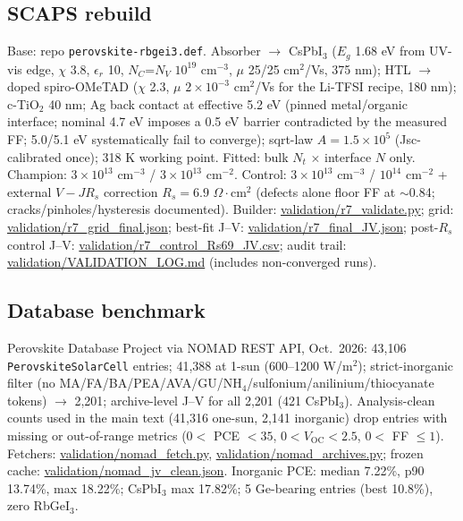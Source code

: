 \documentclass[11pt]{article}
\begin{document}
\subsection*{SCAPS rebuild}
Base: repo \texttt{perovskite-rbgei3.def}. Absorber $\rightarrow$ CsPbI$_{3}$ ($E_{g}$ 1.68 eV from UV-vis edge, $\chi$ 3.8, $\epsilon_{r}$ 10, $N_{C}$=$N_{V}$ $10^{19}$ cm$^{-3}$, $\mu$ 25/25 cm$^{2}$/Vs, 375 nm); HTL $\rightarrow$ doped spiro-OMeTAD ($\chi$ 2.3, $\mu$ $2\times10^{-3}$ cm$^{2}$/Vs for the Li-TFSI recipe, 180 nm); c-TiO$_{2}$ 40 nm; Ag back contact at effective 5.2 eV (pinned metal/organic interface; nominal 4.7 eV imposes a 0.5 eV barrier contradicted by the measured FF; 5.0/5.1 eV systematically fail to converge); sqrt-law $A=1.5\times10^{5}$ (Jsc-calibrated once); 318 K working point. Fitted: bulk $N_{t}$ $\times$ interface $N$ only. Champion: $3\times10^{13}$ cm$^{-3}$ / $3\times10^{13}$ cm$^{-2}$. Control: $3\times10^{13}$ cm$^{-3}$ / $10^{14}$ cm$^{-2}$ + external $V-JR_{s}$ correction $R_{s}=6.9$ $\Omega\cdot$cm$^{2}$ (defects alone floor FF at $\sim$0.84; cracks/pinholes/hysteresis documented). Builder: \url{validation/r7_validate.py}; grid: \url{validation/r7_grid_final.json}; best-fit J--V: \url{validation/r7_final_JV.json}; post-$R_{s}$ control J--V: \url{validation/r7_control_Rs69_JV.csv}; audit trail: \url{validation/VALIDATION_LOG.md} (includes non-converged runs).
\subsection*{Database benchmark}
Perovskite Database Project via NOMAD REST API, Oct.\ 2026: 43,106 \texttt{PerovskiteSolarCell} entries; 41,388 at 1-sun (600--1200 W/m$^{2}$); strict-inorganic filter (no MA/\allowbreak{}FA/\allowbreak{}BA/\allowbreak{}PEA/\allowbreak{}AVA/\allowbreak{}GU/\allowbreak{}NH$_{4}$/\allowbreak{}sulfonium/\allowbreak{}anilinium/\allowbreak{}thiocyanate tokens) $\rightarrow$ 2,201; archive-level J--V for all 2,201 (421 CsPbI$_{3}$). Analysis-clean counts used in the main text (41,316 one-sun, 2,141 inorganic) drop entries with missing or out-of-range metrics ($0<$ PCE $<35$, $0<V_{\mathrm{OC}}<2.5$, $0<$ FF $\le1$). Fetchers: \url{validation/nomad_fetch.py}, \url{validation/nomad_archives.py}; frozen cache: \url{validation/nomad_jv_clean.json}. Inorganic PCE: median 7.22\%, p90 13.74\%, max 18.22\%; CsPbI$_{3}$ max 17.82\%; 5 Ge-bearing entries (best 10.8\%), zero RbGeI$_{3}$.
\end{document}
